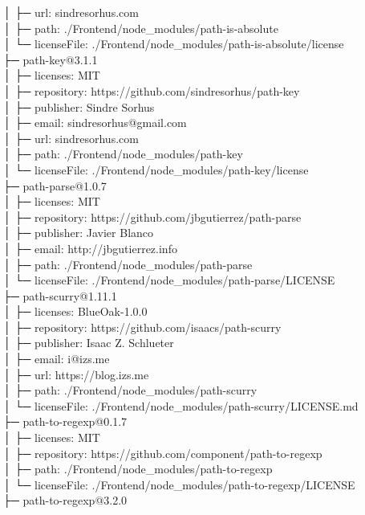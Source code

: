 │  ├─ url: sindresorhus.com\\
│  ├─ path: ./Frontend/node\_modules/path-is-absolute\\
│  └─ licenseFile: ./Frontend/node\_modules/path-is-absolute/license\\
├─ path-key@3.1.1\\
│  ├─ licenses: MIT\\
│  ├─ repository: https://github.com/sindresorhus/path-key\\
│  ├─ publisher: Sindre Sorhus\\
│  ├─ email: sindresorhus@gmail.com\\
│  ├─ url: sindresorhus.com\\
│  ├─ path: ./Frontend/node\_modules/path-key\\
│  └─ licenseFile: ./Frontend/node\_modules/path-key/license\\
├─ path-parse@1.0.7\\
│  ├─ licenses: MIT\\
│  ├─ repository: https://github.com/jbgutierrez/path-parse\\
│  ├─ publisher: Javier Blanco\\
│  ├─ email: http://jbgutierrez.info\\
│  ├─ path: ./Frontend/node\_modules/path-parse\\
│  └─ licenseFile: ./Frontend/node\_modules/path-parse/LICENSE\\
├─ path-scurry@1.11.1\\
│  ├─ licenses: BlueOak-1.0.0\\
│  ├─ repository: https://github.com/isaacs/path-scurry\\
│  ├─ publisher: Isaac Z. Schlueter\\
│  ├─ email: i@izs.me\\
│  ├─ url: https://blog.izs.me\\
│  ├─ path: ./Frontend/node\_modules/path-scurry\\
│  └─ licenseFile: ./Frontend/node\_modules/path-scurry/LICENSE.md\\
├─ path-to-regexp@0.1.7\\
│  ├─ licenses: MIT\\
│  ├─ repository: https://github.com/component/path-to-regexp\\
│  ├─ path: ./Frontend/node\_modules/path-to-regexp\\
│  └─ licenseFile: ./Frontend/node\_modules/path-to-regexp/LICENSE\\
├─ path-to-regexp@3.2.0\\
